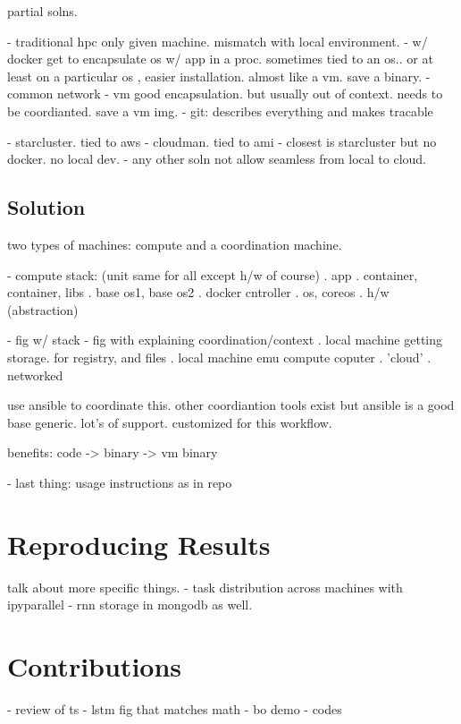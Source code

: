 partial solns.

- traditional hpc only given machine. mismatch with local environment.
- w/ docker get to encapsulate os w/ app in a proc. sometimes tied to an os.. or at least on a particular os , easier installation. almost like a vm. save a binary.
- common network
- vm good encapsulation. but usually out of context. needs to be coordianted. save a vm img.
- git: describes everything and makes tracable


- starcluster. tied to aws
- cloudman. tied to ami
- closest is starcluster but no docker. no local dev.
- any other soln not allow seamless from local to cloud.


\section{Solution}

two types of machines: compute and a coordination machine.

- compute stack: (unit same for all except h/w of course)
. app
. container, container, libs
. base os1, base os2
. docker cntroller
. os, coreos
. h/w (abstraction)



- fig w/ stack
- fig with explaining coordination/context
. local machine getting storage. for registry, and files
. local machine emu compute coputer
. 'cloud'
. networked 

use ansible to coordinate this. other coordiantion tools exist but ansible is a good base generic. lot's of support. customized for this workflow.


benefits:
code -> binary -> vm binary

- last thing: usage instructions as in repo


\chapter{Reproducing Results}

talk about more specific things.
- task distribution across machines with ipyparallel
- rnn storage in mongodb as well.

\chapter{Contributions}

- review of ts
- lstm fig that matches math
- bo demo
- codes

